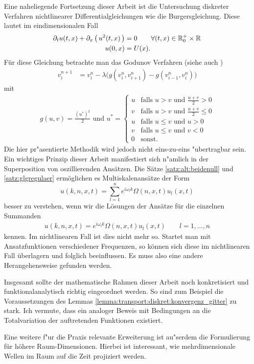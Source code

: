 
Eine naheliegende Fortsetzung dieser Arbeit ist die Untersuchung diskreter Verfahren nichtlinearer Differentialgleichungen wie die Burgersgleichung.
Diese lautet im eindimensionalen Fall
\begin{align}
\begin{split}
\partial_t u(t,x) + \partial_x \left( \, u^2(t,x) \,\right) &= 0 \qquad \forall (t,x) \in \mathbb R^+_0 \times \mathbb R\\
u(0,x) &= U(x).
\end{split}
\end{align}
Für diese Gleichung betrachte man das Godunov Verfahren (siehe auch \cite{leveque2002finite})
\begin{align}
v^{n+1}_i &= v^n_i - \lambda \bigl( g(v^n_i, v^n_{i+1}) - g(v^n_{i-1}, v^n_i) \bigr)
\end{align}
mit
\begin{align}
g(u,v) = \frac{\left(u^*\right)^2}2 \text{ und } u^* =
\begin{cases}
u & \text{falls $u > v$ und $\frac {u+v}2 > 0$}\\
v & \text{falls $u > v$ und $\frac {u+v}2 \leq 0$}\\
u & \text{falls $u \leq v$ und $u > 0$}\\
v & \text{falls $u \leq v$ und $v < 0$}\\
0 & \text{sonst.}
\end{cases}
\end{align}
Die hier pr"asentierte Methodik wird jedoch nicht eins-zu-eins "ubertragbar sein.
Ein wichtiges Prinzip dieser Arbeit manifestiert sich n"amlich in der Superposition von oszillierenden Ansätzen.
Die Sätze \ref{satz:alt:beidenull} und \ref{satz:glgregulaer} ermöglichen es Multiskalenansätze der Form
\[ u(k,n,x,t) = \sum_{l=1}^n e^{i \omega_l k} \Omega(n,x,t) u_l(x,t) \]
besser zu verstehen, wenn wir die Lösungen der Ansätze für die einzelnen Summanden
\begin{align}\label{burgers:1}
u(k,n,x,t) = e^{i \omega_l k} \Omega(n,x,t) u_l(x,t) \qquad l = 1, \ldots, n
\end{align}
kennen.
Im nichtlinearen Fall ist dies nicht mehr so.
Startet man mit Ansatzfunktionen verschiedener Frequenzen, so können sich diese im nichtlinearen Fall überlagern und folglich beeinflussen.
Es muss also eine andere Herangehensweise gefunden werden.

Insgesamt sollte der mathematische Rahmen dieser Arbeit noch konkretisiert und funktionalanalytisch richtig eingeordnet werden.
So sind zum Beispiel die Voraussetzungen des Lemmas \ref{lemma:transport:diskret:konvergenz_gitter} zu stark.
Ich vermute, dass ein analoger Beweis mit Bedingungen an die Totalvariation der auftretenden Funktionen existiert.

Eine weitere f"ur die Praxis relevante Erweiterung ist au"serdem die Formulierung für höhere Raum-Dimensionen.
Hierbei ist interessant, wie mehrdimensionale Wellen im Raum auf die Zeit projiziert werden. 